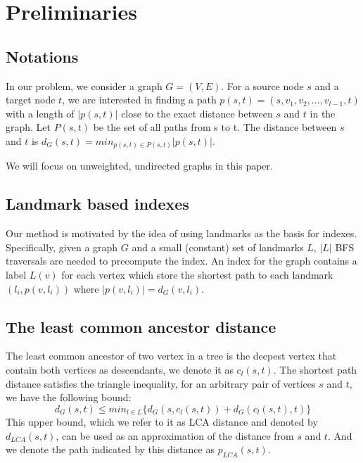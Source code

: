 \section{Preliminaries}
\label{preliminary}

\subsection{Notations}
In our problem, we consider a graph $G = (V,E)$. For a source node $s$ and a target node $t$, we are interested in finding a path $p(s,t)=(s,v_1,v_2,...,v_{l-1},t)$ with a length of $|p(s,t)|$ close to the exact distance between $s$ and $t$ in the graph. Let $P(s,t)$ be the set of all paths from s to t. The distance between $s$ and $t$ is $d_G(s,t) = min_{p(s,t) \in P(s,t)}|p(s,t)|$.

We will focus on unweighted, undirected graphs in this paper.

\subsection{Landmark based indexes}

Our method is motivated by the idea of using landmarks as the basis for indexes. Specifically, given a graph $G$ and a small (constant) set of landmarks $L$, $|L|$ BFS traversals are needed to precompute the index. An index for the graph contains a label $L(v)$ for each vertex which store the shortest path to each landmark $(l_i, p(v,l_i))$ where $|p(v,l_i)| = d_G(v,l_i)$.

\subsection{The least common ancestor distance}

The least common ancestor of two vertex in a tree is the deepest vertex that contain both vertices as descendants, we denote it as $c_l(s,t)$. The shortest path distance satisfies the triangle inequality, for an arbitrary pair of vertices $s$ and $t$, we have the following bound:
\begin{equation}
    d_G(s,t) \leq min_{l \in L}\{d_G(s,c_l(s,t)) + d_G(c_l(s,t),t)\}
\end{equation}
This upper bound, which we refer to it as LCA distance and denoted by $d_{LCA}(s,t)$, can be used as an approximation of the distance from $s$ and $t$. And we denote the path indicated by this distance as $p_{LCA}(s,t)$.